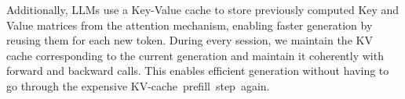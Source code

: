 Additionally, LLMs use a Key-Value cache to store previously computed Key and Value matrices from the attention mechanism, enabling faster generation by reusing them for each new token.
During every \Tool{} session, we maintain the KV cache corresponding to the current generation and maintain it coherently with forward and backward calls. 
This enables efficient generation without having to go through the expensive \mbox{KV-cache prefill step again.}

